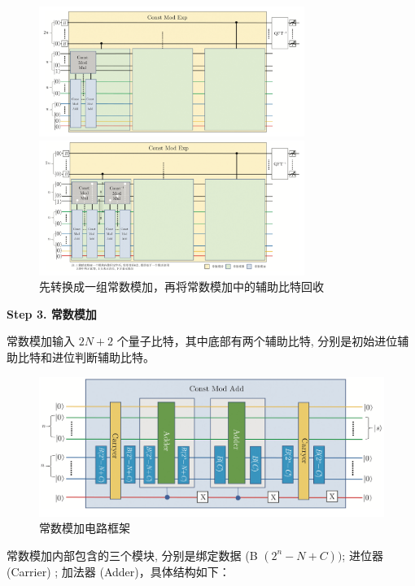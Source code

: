 \documentclass[12pt,hyperref,a4paper,UTF8]{ctexart}
\begin{document}
\newpage
\begin{figure}[!htbp]
	\begin{minipage}{0.5\linewidth}
		\centering
		\includegraphics[width=3.4in]{figures/常数模乘2.png}
	\end{minipage}
	\begin{minipage}{0.5\linewidth}
		\centering
		\includegraphics[width=3.4in]{figures/常数模乘3.png}
	\end{minipage}
    \caption{先转换成一组常数模加，再将常数模加中的辅助比特回收}
\end{figure}

\vskip 10pt
\noindent
\textbf{Step 3. 常数模加}
\vskip 10pt

常数模加输入 $2 N+2$ 个量子比特，其中底部有两个辅助比特, 分别是初始进位辅助比特和进位判断辅助比特。

\begin{figure}[!htbp]     
    \centering     
    \includegraphics[width =0.7 \textwidth]{figures/常数模加电路框架.png}     
    \caption{常数模加电路框架}
\end{figure}

\noindent
常数模加内部包含的三个模块, 分别是绑定数据 (B $\left(2^n-N+C\right))$; 进位器 (Carrier) ; 加法器 (Adder)，具体结构如下：
\end{document}
